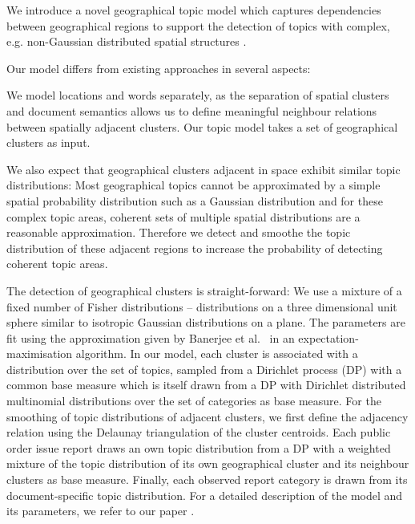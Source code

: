 \documentclass[external]{20120615_deliverable_template_ukob}
\theoremstyle{definition}
\begin{document}
We introduce a novel geographical topic model which captures
dependencies between geographical regions to support the detection of
topics with complex, e.g. non-Gaus\-sian distributed spatial
structures \cite{CCK1}.

Our model differs from existing approaches in several aspects:

We model locations and words separately, as the separation of spatial
clusters and document semantics allows us to define meaningful
neighbour relations between spatially adjacent clusters. Our topic
model takes a set of geographical clusters as input.

We also expect that geographical clusters adjacent in space exhibit
similar topic distributions: Most geographical topics cannot be
approximated by a simple spatial probability distribution such as a
Gaussian distribution and for these complex topic areas, coherent sets
of multiple spatial distributions are a reasonable approximation.
Therefore we detect and smoothe the topic distribution of these
adjacent regions to increase the probability of detecting coherent
topic areas.

The detection of geographical clusters is straight-forward: We use a
mixture of a fixed number of Fisher distributions -- distributions on
a three dimensional unit sphere similar to isotropic Gaussian
distributions on a plane. The parameters are fit using the
approximation given by Banerjee et
al.~\cite{DBLP:journals/jmlr/BanerjeeDGS05} in an
expectation-maximisation algorithm.  In our model, each cluster is
associated with a distribution over the set of topics, sampled from a
Dirichlet process (DP) with a common base measure which is itself
drawn from a DP with Dirichlet distributed multinomial distributions
over the set of categories as base measure.  For the smoothing of
topic distributions of adjacent clusters, we first define the
adjacency relation using the Delaunay triangulation
\cite{journals/csur/Aurenhammer91} of the cluster centroids.  Each
public order issue report draws an own topic distribution from a DP
with a weighted mixture of the topic distribution of its own
geographical cluster and its neighbour clusters as base measure.
Finally, each observed report category is drawn from its
document-specific topic distribution.  For a detailed description of
the model and its parameters, we refer to our paper \cite{CCK1}.
\end{document}
